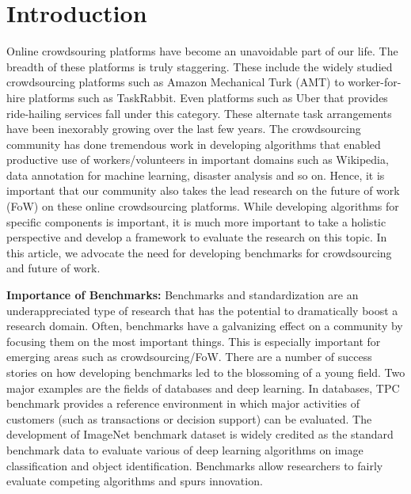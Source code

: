 \section{Introduction}\label{sec:introduction}

Online crowdsouring platforms have become an unavoidable part of our life.
The breadth of these platforms is truly staggering.
These include the widely studied crowdsourcing platforms such as Amazon Mechanical Turk (AMT)
to worker-for-hire platforms such as TaskRabbit.
Even platforms such as Uber that provides ride-hailing services fall under this category.
These alternate task arrangements have been inexorably growing over the last few years.
The crowdsourcing community has done tremendous work in developing algorithms
that enabled productive use of workers/volunteers in important domains
such as Wikipedia, data annotation for machine learning, disaster analysis and so on.
Hence, it is important that our community also takes the lead research on the future of work (FoW) on these online crowdsourcing platforms.
While developing algorithms for specific components is important,
it is much more important to take a holistic perspective and
develop a framework to evaluate the research on this topic.
In this article, we advocate the need for developing benchmarks for crowdsourcing and future of work.

\textbf{Importance of Benchmarks:}
Benchmarks and standardization are an underappreciated type of research
that has the potential to dramatically boost a research domain.
Often, benchmarks have a galvanizing effect on a community by focusing them on the most important things.
This is especially important for emerging areas such as crowdsourcing/FoW.
There are a number of success stories on how developing benchmarks led to the blossoming of a young field.
Two major examples are the fields of databases and deep learning.
In databases, TPC benchmark provides a reference environment in which major
activities of customers (such as transactions or decision support) can be evaluated.
The development of ImageNet benchmark dataset is widely credited as the standard benchmark data to evaluate various of deep learning algorithms on image classification and object identification.
Benchmarks allow researchers to fairly evaluate competing algorithms and spurs innovation.


